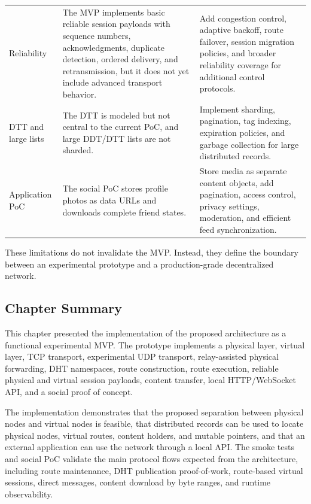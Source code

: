 \documentclass[12pt]{article}
\begin{document}
\begin{longtable}{L{0.19\textwidth} L{0.34\textwidth} L{0.35\textwidth}}
Reliability & The MVP implements basic reliable session payloads with sequence numbers, acknowledgments, duplicate detection, ordered delivery, and retransmission, but it does not yet include advanced transport behavior. & Add congestion control, adaptive backoff, route failover, session migration policies, and broader reliability coverage for additional control protocols. \\

DTT and large lists & The DTT is modeled but not central to the current PoC, and large DDT/DTT lists are not sharded. & Implement sharding, pagination, tag indexing, expiration policies, and garbage collection for large distributed records. \\

Application PoC & The social PoC stores profile photos as data URLs and downloads complete friend states. & Store media as separate content objects, add pagination, access control, privacy settings, moderation, and efficient feed synchronization. \\
\end{longtable}
\endgroup

These limitations do not invalidate the MVP. Instead, they define the boundary between an experimental prototype and a production-grade decentralized network.

\subsection{Chapter Summary}
\label{sec:implementation-summary}

This chapter presented the implementation of the proposed architecture as a functional experimental MVP. The prototype implements a physical layer, virtual layer, TCP transport, experimental UDP transport, relay-assisted physical forwarding, DHT namespaces, route construction, route execution, reliable physical and virtual session payloads, content transfer, local HTTP/WebSocket API, and a social proof of concept.

The implementation demonstrates that the proposed separation between physical nodes and virtual nodes is feasible, that distributed records can be used to locate physical nodes, virtual routes, content holders, and mutable pointers, and that an external application can use the network through a local API. The smoke tests and social PoC validate the main protocol flows expected from the architecture, including route maintenance, DHT publication proof-of-work, route-based virtual sessions, direct messages, content download by byte ranges, and runtime observability.
\end{document}
